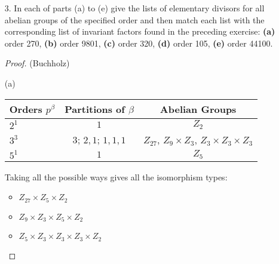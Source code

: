 \documentclass[10pt]{article}
\newcommand{\Z}{\mathbb{Z}}
\begin{document}
\begin{itemize}
\begin{proof}
\begin{item}
\begin{center}
\begin{tabular}{ l  c }
	$n_2=3 \cdot 7$ & $A\cong \Z / 2100\Z \times \Z / 21\Z$ \\ \hline
	\hline
	$n_1=2^2 \cdot 3^2 \cdot 5 \cdot 7$ & \\ \hline
	$n_2=5 \cdot 7$ & $A\cong \Z / 1260\Z \times \Z / 35\Z$ \\ \hline
	\hline
	$n_1=2 \cdot 3 \cdot 5^2 \cdot 7$ & \\ \hline
	$n_2=2 \cdot 3 \cdot 7$ & $A\cong \Z / 1050\Z \times \Z / 42\Z$ \\ \hline
	\hline
	$n_1=2 \cdot 3^2 \cdot 5 \cdot 7$ & \\ \hline
	$n_2=2 \cdot 5 \cdot 7$ & $A\cong \Z / 630\Z \times \Z / 70\Z$ \\ \hline
	\hline
  \end{tabular}
\end{center} 

\end{item}

\end{proof}


\item[3.]  In each of parts (a) to (e) give the lists of elementary
  divisors for all abelian groups of the specified order and then
  match each list with the corresponding list of invariant factors
  found in the preceding exercise: \textbf{(a)} order 270,
  \textbf{(b)} order 9801, \textbf{(c)} order 320, \textbf{(d)} order
  105, \textbf{(e)} order 44100.

\begin{proof}(Buchholz) \

\begin{item} (a)
\begin{center}
  \begin{tabular}{ l c c  }
    Orders $p^{\beta}$ & Partitions of $\beta$ & Abelian Groups\\ \hline
    $2^1$ & $1$ & $Z_{2}$ \\ \hline
  	$3^{3}$ & $3$; $2,1$; $1,1,1$ & $Z_{27}$, $Z_9 \times Z_3 $, $Z_3 \times Z_3 \times Z_3$ \\ \hline
	  $5^1$ & $1$ & $Z_{5}$\\ \hline
	\hline
  \end{tabular}
\end{center} 

Taking all the possible ways gives all the isomorphism types:

\begin{itemize}
	\item $Z_{27} \times Z_{5} \times Z_{2}$
	\item $Z_9 \times Z_3 \times Z_{5} \times Z_{2}$
	\item $Z_5 \times Z_3 \times Z_3 \times Z_{3} \times Z_{2}$ 
\end{itemize}


\end{item}
\end{proof}
\end{itemize}
\end{document}

